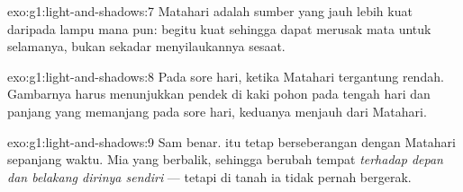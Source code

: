 \begin{solution}{exo:g1:light-and-shadows:7}
Matahari adalah sumber yang jauh lebih kuat daripada lampu mana pun:
 begitu kuat sehingga dapat merusak mata untuk selamanya,
bukan sekadar menyilaukannya sesaat.
\end{solution}

\begin{solution}{exo:g1:light-and-shadows:8}
Pada sore hari, ketika Matahari tergantung rendah. Gambarnya harus
menunjukkan  pendek di kaki pohon pada tengah hari dan
 panjang yang memanjang pada sore hari, keduanya menjauh
dari Matahari.
\end{solution}

\begin{solution}{exo:g1:light-and-shadows:9}
Sam benar.  itu tetap berseberangan dengan Matahari
sepanjang waktu. Mia yang berbalik, sehingga  berubah
tempat \emph{terhadap depan dan belakang dirinya sendiri} --- tetapi
di tanah ia tidak pernah bergerak.
\end{solution}
